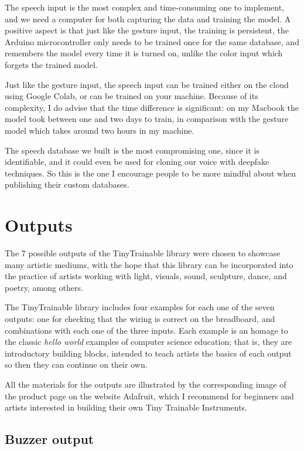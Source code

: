 The speech input is the most complex and time-consuming one to implement, and we need a computer for both capturing the data and training the model. A positive aspect is that just like the gesture input, the training is persistent, the Arduino microcontroller only needs to be trained once for the same database, and remembers the model every time it is turned on, unlike the color input which forgets the trained model.

Just like the gesture input, the speech input can be trained either on the cloud using Google Colab, or can be trained on your machine. Because of its complexity, I do advise that the time difference is significant: on my Macbook the model took between one and two days to train, in comparison with the gesture model which takes around two hours in my machine.

The speech database we built is the most compromising one, since it is identifiable, and it could even be used for cloning our voice with deepfake techniques. So this is the one I encourage people to be more mindful about when publishing their custom databases.

\section{Outputs}

The 7 possible outputs of the TinyTrainable library were chosen to showcase many artistic mediums, with the hope that this library can be incorporated into the practice of artists working with light, visuals, sound, sculpture, dance, and poetry, among others.

The TinyTrainable library includes four examples for each one of the seven outputs: one for checking that the wiring is correct on the breadboard, and combinations with each one of the three inputs. Each example is an homage to the classic \emph{hello world} examples of computer science education; that is, they are introductory building blocks, intended to teach artists the basics of each output so then they can continue on their own.

All the materials for the outputs are illustrated by the corresponding image of the product page on the website Adafruit, which I recommend for beginners and artists interested in building their own Tiny Trainable Instruments.

\subsection{Buzzer output}

